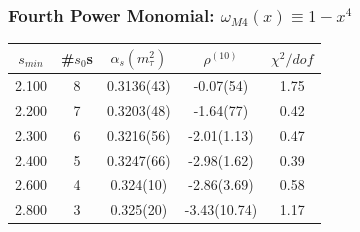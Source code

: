 \documentclass[fleqn]{beamer}
\begin{document}
\begin{frame}
  \frametitle{Fourth Power Monomial: \(\omega_{M4}(x) \equiv 1-x^4\)}
  \centering
  \begin{tabular}{ccccc}
    \toprule
    \(s_{min}\) & \#\(s_0\)s & \(\alpha_s(m_\tau^2)\) & \(\rho^{(10)}\) & \(\chi^2/dof\)  \\
    \midrule
    2.100 & 8  & 0.3136(43) & -0.07(54) & 1.75 \\
    \rowcolor{primary}
    2.200 & 7  & 0.3203(48) & -1.64(77) & 0.42 \\
    2.300 & 6  & 0.3216(56) & -2.01(1.13) & 0.47 \\
    2.400 & 5  & 0.3247(66) & -2.98(1.62) & 0.39 \\
    2.600 & 4  & 0.324(10) & -2.86(3.69) & 0.58 \\
    2.800 & 3  & 0.325(20) & -3.43(10.74) & 1.17 \\
    \bottomrule
  \end{tabular}
\end{frame}
\end{document}
